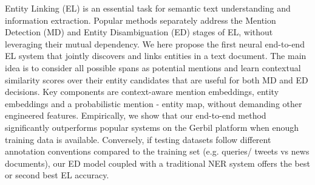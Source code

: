 Entity Linking (EL) is an essential task for semantic text understanding and information extraction. Popular methods separately address the Mention Detection (MD) and Entity Disambiguation (ED) stages of EL, without leveraging their mutual dependency. We here propose the first neural end-to-end EL system that jointly discovers and links entities in a text document. The main idea is to consider all possible spans as potential mentions and learn contextual similarity scores over their entity candidates that are useful for both MD and ED decisions. Key components are context-aware mention embeddings, entity embeddings and a probabilistic mention - entity map, without demanding other engineered features. Empirically, we show that our end-to-end method significantly outperforms popular systems on the Gerbil platform when enough training data is available. Conversely, if testing datasets follow different annotation conventions compared to the training set (e.g. queries/ tweets vs news documents), our ED model coupled with a traditional NER system offers the best or second best EL accuracy.
